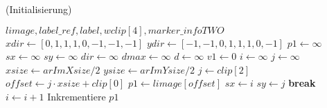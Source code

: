 \begin{algorithm}[ht]
\caption{ (Initialisierung)}
\label{alg:argetcontour-1}
\begin{algorithmic}[1]
	\Require $\mathit{limage},\mathit{label\_ref},\mathit{label},\mathit{wclip}\left[4\right],\mathit{marker\_infoTWO}$ 
	\State $\mathit{xdir} \gets \left[0, 1, 1, 1, 0,-1,-1,-1\right]$
	\label{alg:argetcontour-1-initvar-start}
	\State $\mathit{ydir} \gets \left[-1,-1, 0, 1, 1, 1, 0,-1\right]$
	\label{alg:argetcontour-1-initvar-neighbour}
	\State $\mathit{p1} \gets \infty$
	\State $\mathit{sx} \gets \infty$
	\State $\mathit{sy} \gets \infty$
	\State $\mathit{dir} \gets \infty$
	\State $\mathit{dmax} \gets \infty$
	\State $d \gets \infty$
	\State $\mathit{v1} \gets 0$
	\State $i \gets \infty$
	\State $j \gets \infty$
	\State $\mathit{xsize} \gets \mathit{arImXsize} / 2$
	\label{alg:argetcontour-1-initsizex}
	\State $\mathit{ysize} \gets \mathit{arImYsize} / 2$
	\label{alg:argetcontour-1-initvar-end}
	\State $j \gets \mathit{clip}\left[2\right]$
	\State $\mathit{offset} \gets j \cdot \mathit{xsize} + \mathit{clip}\left[0\right]$
	\label{alg:argetcontour-1-offset}
	\State $\mathit{p1} \gets \mathit{limage}\left[\mathit{offset}\right]$
	\label{alg:argetcontour-1-p1}
	\label{alg:argetcontour-1-loop-start}
		\label{alg:argetcontour-1-haslabel-start}
			\State $\mathit{sx} \gets i$
			\label{alg:argetcontour-1-savex}
			\State $\mathit{sy} \gets j$
			\label{alg:argetcontour-1-savey}
			\State \textbf{break}
		\EndIf
		\label{alg:argetcontour-1-haslabel-end}
		\State $i \gets i + 1$
		\label{alg:argetcontour-1-inci}
		\State Inkrementiere $\mathit{p1}$
		\label{alg:argetcontour-1-incp1}
	\EndFor
	\label{alg:argetcontour-1-loop-end}
\end{algorithmic}
\end{algorithm}
